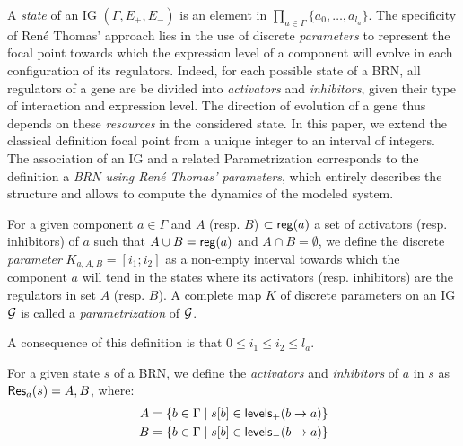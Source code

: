 A \emph{state} of an IG $(\Gamma, E_+, E_-)$ is an element in $\prod_{a \in \Gamma} \{a_0, \dots, a_{l_a}\}$.
The specificity of René Thomas' approach lies in the use of discrete \emph{parameters} to represent the focal point towards which the expression level of a component will evolve in each configuration of its regulators.
Indeed, for each possible state of a BRN, all regulators of a gene are be divided into \emph{activators} and \emph{inhibitors}, given their type of interaction and expression level.
The direction of evolution of a gene thus depends on these \emph{resources} in the considered state.
In this paper, we extend the classical definition focal point from a unique integer to an interval of integers.
The association of an IG and a related Parametrization corresponds to the definition a \emph{BRN using René Thomas' parameters}, which entirely describes the structure and allows to compute the dynamics of the modeled system.

\begin{definition}\label{def:param}
For a given component $a \in \Gamma$ and $A$ (resp. $B$) $\subset \mathsf{reg}({a})$ a set of activators (resp. inhibitors) of $a$ such that
$A \cup B = \mathsf{reg}({a})$ and $A \cap B = \emptyset$,
we define the discrete \emph{parameter} $K_{a,A,B} = [i_1; i_2]$ as a non-empty interval towards which the component $a$ will tend
in the states where its activators (resp. inhibitors) are the regulators in set $A$ (resp. $B$).
A complete map $K$ of discrete parameters on an IG $\mathcal{G}$ is called a \emph{parametrization} of $\mathcal{G}$.
\end{definition}
A consequence of this definition is that $0 \leq i_1 \leq i_2 \leq l_a$.

\begin{definition}\label{def:resources}
For a given state $s$ of a BRN, we define the \emph{activators} and \emph{inhibitors} of $a$ in $s$ as $\mathsf{Res}_{a}(s) = A,B$, where:
\begin{align*}
  A &= \{b \in \Gamma \mid {s[b]} \in \mathsf{levels}_+(b\rightarrow a)\} \\
  B &= \{b \in \Gamma \mid {s[b]} \in \mathsf{levels}_-(b\rightarrow a)\}
\end{align*}
\end{definition}

